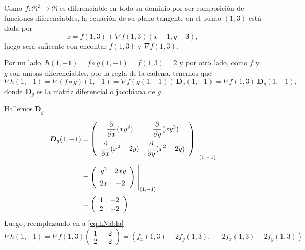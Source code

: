 \newpage
\begin{solution}

    Como   $f:\Re^2\to\Re$ es diferenciable en todo su dominio por ser composición de funciones diferenciables,  la ecuaci\'on de su plano tangente en el punto $(1,3)$ est\'a dada por
    \begin{equation}
        z= f(1,3) + \nabla f(1,3) (x-1,y-3),  \label{eq:zNabla}
    \end{equation}   luego ser\'a  suficente con encontar $ f(1,3)$ y $\nabla f(1,3).$

    Por un lado,      $h(1,-1)= f\circ g (1,-1) =  f(1,3)=2$  y por otro lado,  como $f$ y $g$ son ambas diferenciables,  por la regla de la cadena,  tenemos que
    \begin{equation}
        \nabla h(1,-1)=\nabla (f\circ g)(1,-1)=\nabla f(g(1,-1)) \:\boldsymbol{D}_g(1,-1) = \nabla f (1,3) \:\boldsymbol{D}_g(1,-1),  \label{eq:hNabla}
    \end{equation}    donde $\boldsymbol{D}_g$ es la matriz diferencial o  jacobiana de $g$.

    \noindent  Hallemos $\boldsymbol{D}_g$
    \begin{align*}
        \boldsymbol{D}_g(1,-1) & =
        \left(\begin{array}{cc}
                      \displaystyle\partialx (xy^2)            & \displaystyle\partialy (xy^2)           \\[10pt]
                      \displaystyle\partialx  (x^2 -2y) & \displaystyle\partialy (x^2 -2y)
                  \end{array}\right)\left.\rule{0pt}{1.1cm}\right\rvert_{(1,-1)}             \\[2pt]
                              & =\left(\begin{array}{cc}
                                               \displaystyle y^2                 & \displaystyle 2xy              \\[5pt]
                                               \displaystyle   2x & \displaystyle -2
                                           \end{array}\right)\left.\rule{0pt}{0.7cm}\right\rvert_{(1,-1)} \\[2pt]
                              & =\left(\begin{array}{cc}
                                               1    & -2    \\
                                               2 & -2
                                           \end{array}\right)
    \end{align*}
    Luego, reemplazando en  a   \eqref{eq:hNabla}
    \[
        \nabla h(1,-1) = \nabla f(1,3)\left(\begin{array}{cc}
                1   & -2    \\
                2 & -2
            \end{array}\right) = \left(f_x(1,3) + 2f_y(1,3),\;-2f_x(1,3)-2f_y(1,3)\right)
    \]


\end{solution}
